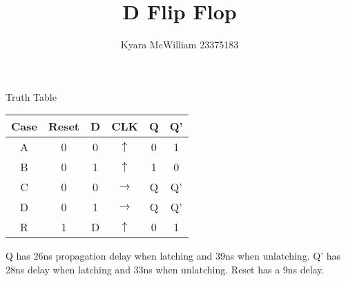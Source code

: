 \documentclass{article}
\title{D Flip Flop}
\author{Kyara McWilliam 23375183}
\date{}
\begin{document}
\maketitle

Truth Table
\hfill \break

\begin{tabular}{ |c|c|c|c|c|c| }
\hline
Case & Reset & D & CLK & Q & Q'\\
\hline
A & 0 & 0 & $\uparrow$ & 0 & 1 \\
B & 0 & 1 & $\uparrow$ & 1 & 0 \\
C & 0 & 0 & $\rightarrow$ & Q & Q' \\
D & 0 & 1 & $\rightarrow$ & Q & Q'\\
R & 1 & D & $\uparrow$ & 0 & 1\\
\hline
\end{tabular}

\hfill \break

Q has 26ns propagation delay when latching and 39ns when unlatching. \newline
Q' has 28ns delay when latching and 33ns when unlatching.
Reset has a 9ns delay.
\end{document}
